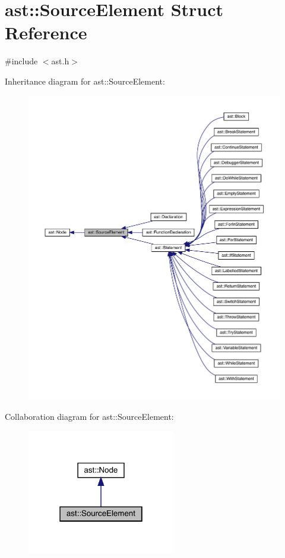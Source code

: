 \hypertarget{structast_1_1_source_element}{}\section{ast\+:\+:Source\+Element Struct Reference}
\label{structast_1_1_source_element}


{\ttfamily \#include $<$ast.\+h$>$}



Inheritance diagram for ast\+:\+:Source\+Element\+:\nopagebreak
\begin{figure}[H]
\begin{center}
\leavevmode
\includegraphics[width=350pt]{structast_1_1_source_element__inherit__graph}
\end{center}
\end{figure}


Collaboration diagram for ast\+:\+:Source\+Element\+:\nopagebreak
\begin{figure}[H]
\begin{center}
\leavevmode
\includegraphics[width=183pt]{structast_1_1_source_element__coll__graph}
\end{center}
\end{figure}
